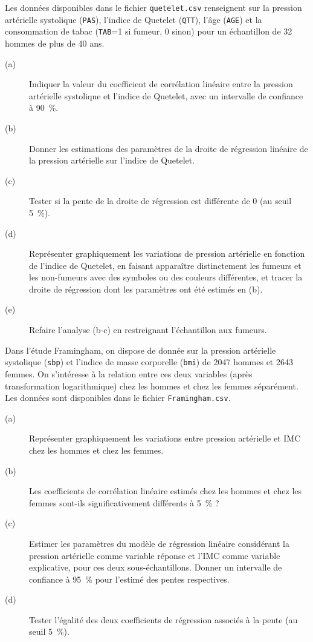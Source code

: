 \begin{exo}\label{exo:5.2}
Les données disponibles dans le fichier \texttt{quetelet.csv} renseignent
sur la pression artérielle systolique (\texttt{PAS}), l'indice de Quetelet
(\texttt{QTT}), l'âge (\texttt{AGE}) et la consommation de tabac
(\texttt{TAB}=1 si fumeur, 0 sinon) pour un échantillon de 32 hommes de plus
de 40 ans. 
\begin{description}
\item[(a)] Indiquer la valeur du coefficient de corrélation linéaire entre
  la pression artérielle systolique et l'indice de Quetelet, avec un
  intervalle de confiance à 90~\%.
\item[(b)] Donner les estimations des paramètres de la droite de régression
  linéaire de la pression artérielle sur l'indice de Quetelet.
\item[(c)] Tester si la pente de la droite de régression est différente de 0
  (au seuil 5~\%).
\item[(d)] Représenter graphiquement les variations de pression artérielle
  en fonction de l'indice de Quetelet, en faisant apparaître distinctement
  les fumeurs et les non-fumeurs avec des symboles ou des couleurs
  différentes, et tracer la droite de régression dont les paramètres ont été
  estimés en (b). 
\item[(e)] Refaire l'analyse (b-c) en restreignant l'échantillon aux
  fumeurs.
\end{description}
\end{exo}

\begin{exo}\label{exo:5.3}
Dans l'étude Framingham, on dispose de donnée sur la pression artérielle
systolique (\texttt{sbp}) et l'indice de masse corporelle (\texttt{bmi}) de
2047 hommes et 2643 femmes.\autocite[p.~63]{dupont09} On s'intéresse à la
relation entre ces deux variables (après transformation logarithmique) chez
les hommes et chez les femmes séparément.
Les données sont disponibles dans le fichier \texttt{Framingham.csv}.
\begin{description}
\item[(a)] Représenter graphiquement les variations entre pression
  artérielle et IMC chez les hommes et chez les femmes.
\item[(b)] Les coefficients de corrélation linéaire estimés chez les hommes
  et chez les femmes sont-ils significativement différents à 5~\% ?
\item[(c)] Estimer les paramètres du modèle de régression linéaire
  considérant la pression artérielle comme variable réponse et l'IMC comme
  variable explicative, pour ces deux sous-échantillons. Donner un
  intervalle de confiance à 95~\% pour l'estimé des pentes respectives.
\item[(d)] Tester l'égalité des deux coefficients de régression associés à
  la pente (au seuil 5~\%).
\end{description}
\end{exo}

